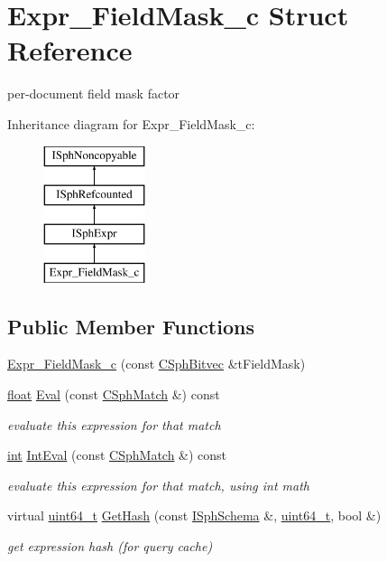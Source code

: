 \hypertarget{structExpr__FieldMask__c}{\section{Expr\-\_\-\-Field\-Mask\-\_\-c Struct Reference}
\label{structExpr__FieldMask__c}
}


per-\/document field mask factor  


Inheritance diagram for Expr\-\_\-\-Field\-Mask\-\_\-c\-:\begin{figure}[H]
\begin{center}
\leavevmode
\includegraphics[height=4.000000cm]{structExpr__FieldMask__c}
\end{center}
\end{figure}
\subsection*{Public Member Functions}
\begin{DoxyCompactItemize}
\item 
\hyperlink{structExpr__FieldMask__c_a066431b2df44ce5075ad722eaf471873}{Expr\-\_\-\-Field\-Mask\-\_\-c} (const \hyperlink{classCSphBitvec}{C\-Sph\-Bitvec} \&t\-Field\-Mask)
\item 
\hyperlink{sphinxexpr_8cpp_a0e0d0739f7035f18f949c2db2c6759ec}{float} \hyperlink{structExpr__FieldMask__c_a02e3d9ea89e4c34c06ffd77bbbeed6b1}{Eval} (const \hyperlink{classCSphMatch}{C\-Sph\-Match} \&) const 
\begin{DoxyCompactList}\small\item\em evaluate this expression for that match \end{DoxyCompactList}\item 
\hyperlink{sphinxexpr_8cpp_a4a26e8f9cb8b736e0c4cbf4d16de985e}{int} \hyperlink{structExpr__FieldMask__c_aec64394fdd8f5495be1ae18c76923796}{Int\-Eval} (const \hyperlink{classCSphMatch}{C\-Sph\-Match} \&) const 
\begin{DoxyCompactList}\small\item\em evaluate this expression for that match, using int math \end{DoxyCompactList}\item 
virtual \hyperlink{sphinxstd_8h_aaa5d1cd013383c889537491c3cfd9aad}{uint64\-\_\-t} \hyperlink{structExpr__FieldMask__c_ada7829e7f9a67c121f1a290f3b41877e}{Get\-Hash} (const \hyperlink{classISphSchema}{I\-Sph\-Schema} \&, \hyperlink{sphinxstd_8h_aaa5d1cd013383c889537491c3cfd9aad}{uint64\-\_\-t}, bool \&)
\begin{DoxyCompactList}\small\item\em get expression hash (for query cache) \end{DoxyCompactList}\end{DoxyCompactItemize}

